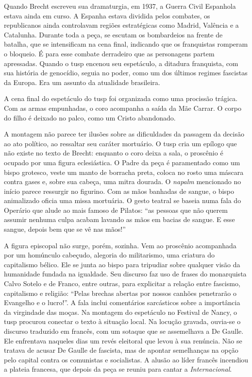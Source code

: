 Quando Brecht escreveu sua dramaturgia, em 1937, a Guerra Civil
Espanhola estava ainda em curso. A Espanha estava dividida pelos
combates, os republicanos ainda controlavam regiões estratégicas como
Madrid, Valência e a Catalunha. Durante toda a peça, se escutam os
bombardeios na frente de batalha, que se intensificam na cena final,
indicando que os franquistas romperam o bloqueio. É para esse combate
derradeiro que as personagens partem apressadas. Quando o {\sc tusp} encenou
seu espetáculo, a ditadura franquista, com sua história de genocídio,
seguia no poder, como um dos últimos regimes fascistas da Europa. Era um
assunto da atualidade brasileira.

A cena final do espetáculo do {\sc tusp} foi organizada como uma procissão
trágica. Com as armas empunhadas, o coro acompanha a saída da Mãe
Carrar. O corpo do filho é deixado no palco, como um Cristo abandonado.

A montagem não parece ter ilusões sobre as dificuldades da passagem da
decisão ao ato político, ao ressaltar seu caráter mortuário. O {\sc tusp} cria
um epílogo que não existe no texto de Brecht: enquanto o coro deixa a
sala, o proscênio é ocupado por uma figura eclesiástica. O Padre da peça
é paramentado como um bispo grotesco, veste um manto de borracha preta,
coloca no rosto uma máscara contra gases e, sobre sua cabeça, uma mitra
dourada. O {\it napalm} mencionado no início parece ressurgir no
figurino. Com as mãos banhadas de sangue, o bispo animalizado oficia uma
missa mortuária. O gesto teatral se baseia numa fala do Operário que
alude ao mais famoso de Pilatos: “as pessoas que não querem assumir
nenhuma culpa acabam lavando as mãos em bacias de sangue. E esse sangue,
depois bem que se vê nas mãos!”

A figura episcopal não surge, porém, sozinha. Vem ao proscênio
acompanhada por um homúnculo cabeçudo, alegoria do militarismo, uma
criatura do capitalismo bélico. Ele se junta ao bispo para tripudiar
sobre qualquer visão da humanidade fundada na igualdade. Seu discurso
faz uso de frases do monarquista Calvo Sotelo e de Franco, entre outras,
para explicitar a relação entre fascismo, capitalismo e religião: “Pelas
brechas abertas por nossos canhões penetrarão o Evangelho e o lucro!”. A
fala inclui comentários sarcásticos sobre a importância da virgindade
das moças. Na montagem do espetáculo no Festival de Nancy, o {\sc tusp}
procurou conectar o texto à situação local. Na locução gravada, ouvia-se
o discurso traduzido em francês, com um sotaque que se assemelhava a De
Gaulle. Ele enfrentava naqueles dias um revés eleitoral que levou à sua
renúncia. Não se tratava de acusar De Gaulle de fascista, mas de apontar
semelhanças na opção pelo capital contra os comunistas e socialistas. A
alusão ao líder francês incendiou a plateia francesa, que depois da peça
se reuniu para cantar a {\it Internacional}.

